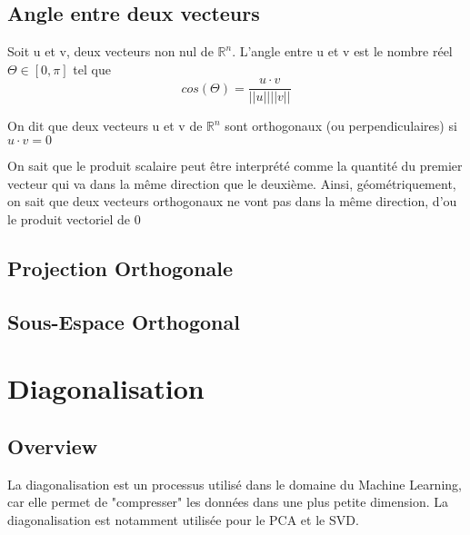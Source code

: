 \documentclass{article}
\begin{document}
\subsection{Angle entre deux vecteurs}

\begin{theorem}
    Soit u et v, deux vecteurs non nul de $\mathbb{R}^n$. L'angle entre
    u et v est le nombre réel $\Theta \in [0, \pi]$ tel que
    $$ cos(\Theta) = \frac{u \cdot v}{||u||||v||}$$
\end{theorem}

\begin{intuition}
\end{intuition}

\begin{theorem}
    On dit que deux vecteurs u et v de $\mathbb{R}^n$ sont orthogonaux
    (ou perpendiculaires) si $u \cdot v = 0$
\end{theorem}

\begin{intuition}
    On sait que le produit scalaire peut être interprété comme la
    quantité du premier vecteur qui va dans la même direction que le
    deuxième. Ainsi, géométriquement, on sait que deux vecteurs orthogonaux
    ne vont pas dans la même direction, d'ou le produit vectoriel de 0
\end{intuition}

\subsection{Projection Orthogonale}




\subsection{Sous-Espace Orthogonal}

\pagebreak

\section{Diagonalisation}

\subsection{Overview}

La diagonalisation est un processus utilisé dans le domaine du Machine Learning,
car elle permet de "compresser" les données dans une plus petite dimension. La
diagonalisation est notamment utilisée pour le PCA et le SVD.\\
\end{document}
